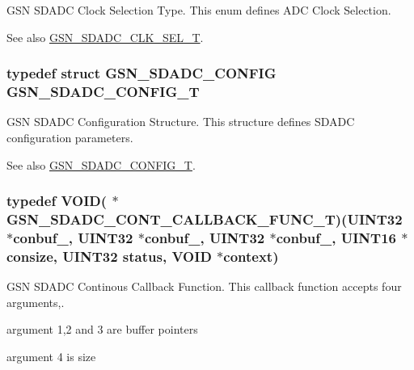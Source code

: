 GSN SDADC Clock Selection Type. This enum defines ADC Clock Selection. 

\begin{DoxySeeAlso}{See also}
\hyperlink{a00652_ga3e84e460cc728aac5ff89621cc0ede91}{GSN\_\-SDADC\_\-CLK\_\-SEL\_\-T}. 
\end{DoxySeeAlso}
\hypertarget{a00652_ga74fd69b30c22ac53de45e0914b171164}{
\subsubsection[{GSN\_\-SDADC\_\-CONFIG\_\-T}]{\setlength{\rightskip}{0pt plus 5cm}typedef struct {\bf GSN\_\-SDADC\_\-CONFIG}  {\bf GSN\_\-SDADC\_\-CONFIG\_\-T}}}
\label{a00652_ga74fd69b30c22ac53de45e0914b171164}


GSN SDADC Configuration Structure. This structure defines SDADC configuration parameters. 

\begin{DoxySeeAlso}{See also}
\hyperlink{a00652_ga74fd69b30c22ac53de45e0914b171164}{GSN\_\-SDADC\_\-CONFIG\_\-T}. 
\end{DoxySeeAlso}
\hypertarget{a00652_gaaa7a87158dc8d5145295c2bc83eb4eb5}{
\subsubsection[{GSN\_\-SDADC\_\-CONT\_\-CALLBACK\_\-FUNC\_\-T}]{\setlength{\rightskip}{0pt plus 5cm}typedef VOID( $\ast$ {\bf GSN\_\-SDADC\_\-CONT\_\-CALLBACK\_\-FUNC\_\-T})({\bf UINT32} $\ast$conbuf\_, {\bf UINT32} $\ast$conbuf\_, {\bf UINT32} $\ast$conbuf\_, {\bf UINT16} $\ast$consize, {\bf UINT32} status, VOID $\ast$context)}}
\label{a00652_gaaa7a87158dc8d5145295c2bc83eb4eb5}


GSN SDADC Continous Callback Function. This callback function accepts four arguments,. 


\begin{DoxyItemize}
\item argument 1,2 and 3 are buffer pointers
\item argument 4 is size
\end{DoxyItemize}


